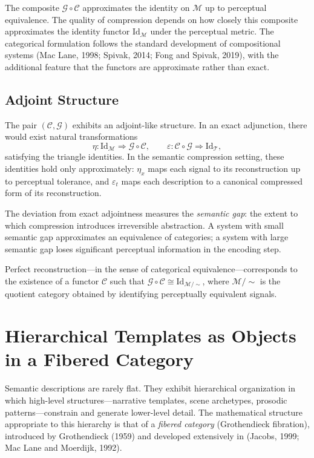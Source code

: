\documentclass[11pt,a4paper]{article}
\theoremstyle{definition}
\theoremstyle{remark}
\begin{document}
The composite $\mathcal{G} \circ \mathcal{C}$ approximates the identity on $\mathcal{M}$ up to perceptual equivalence. The quality of compression depends on how closely this composite approximates the identity functor $\mathrm{Id}_\mathcal{M}$ under the perceptual metric. The categorical formulation follows the standard development of compositional systems (Mac Lane, 1998; Spivak, 2014; Fong and Spivak, 2019), with the additional feature that the functors are approximate rather than exact.

\subsection{Adjoint Structure}

The pair $(\mathcal{C}, \mathcal{G})$ exhibits an adjoint-like structure. In an exact adjunction, there would exist natural transformations
\[
\eta : \mathrm{Id}_\mathcal{M} \Rightarrow \mathcal{G} \circ \mathcal{C}, \qquad \varepsilon : \mathcal{C} \circ \mathcal{G} \Rightarrow \mathrm{Id}_\mathcal{T},
\]
satisfying the triangle identities. In the semantic compression setting, these identities hold only approximately: $\eta_x$ maps each signal to its reconstruction up to perceptual tolerance, and $\varepsilon_t$ maps each description to a canonical compressed form of its reconstruction.

The deviation from exact adjointness measures the \emph{semantic gap}: the extent to which compression introduces irreversible abstraction. A system with small semantic gap approximates an equivalence of categories; a system with large semantic gap loses significant perceptual information in the encoding step.

Perfect reconstruction---in the sense of categorical equivalence---corresponds to the existence of a functor $\mathcal{C}$ such that $\mathcal{G} \circ \mathcal{C} \cong \mathrm{Id}_{\mathcal{M}/\!\sim}$, where $\mathcal{M}/\!\sim$ is the quotient category obtained by identifying perceptually equivalent signals.

\section{Hierarchical Templates as Objects in a Fibered Category}
\label{sec:fibered}

Semantic descriptions are rarely flat. They exhibit hierarchical organization in which high-level structures---narrative templates, scene archetypes, prosodic patterns---constrain and generate lower-level detail. The mathematical structure appropriate to this hierarchy is that of a \emph{fibered category} (Grothendieck fibration), introduced by Grothendieck (1959) and developed extensively in (Jacobs, 1999; Mac Lane and Moerdijk, 1992).
\end{document}
